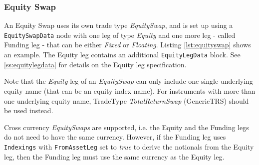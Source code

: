\subsubsection{Equity Swap}
\label{ss:equity_swap}

\ifdefined{}\fi

An Equity Swap uses its own trade type  \emph{EquitySwap}, and is set up using a {\tt EquitySwapData} node with one leg of type  \emph{Equity} and one more leg - called Funding leg -  that can be either \emph{Fixed} or  \emph{Floating}. Listing \ref{lst:equityswap} shows an example. The
Equity leg contains an additional {\tt EquityLegData} block. See \ref{ss:equitylegdata} for details on the Equity leg specification.

Note that the  \emph{Equity} leg of an \emph{EquitySwap} can only include one single underlying equity name (that can be an equity index name). For instruments with more than one underlying equity name, TradeType \emph{TotalReturnSwap} (GenericTRS) should be used instead.

Cross currency \emph{EquitySwaps} are supported, i.e. the Equity and the Funding legs do not need to have the same currency. However, if the Funding leg uses \lstinline!Indexings! with \lstinline!FromAssetLeg! 
 set to \emph{true} to derive the notionals from the Equity leg, then the Funding leg must use the same currency as the Equity leg.
 
